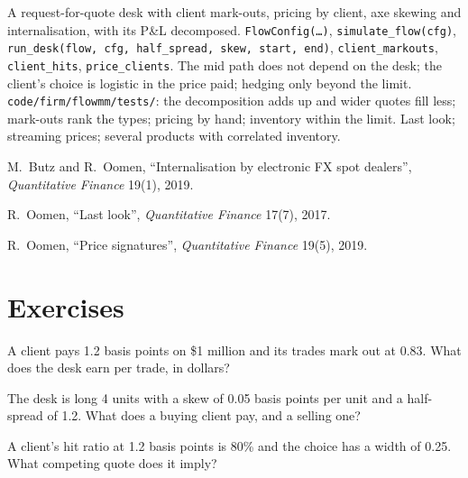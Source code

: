 \begin{build}
 A request-for-quote desk with client mark-outs, pricing by client, axe skewing and internalisation, with its P\&L decomposed.
 \texttt{FlowConfig(\dots)}, \texttt{simulate\_flow(cfg)}, \texttt{run\_desk(flow, cfg, half\_spread, skew, start, end)},
\texttt{client\_markouts}, \texttt{client\_hits}, \texttt{price\_clients}.
 The mid path does not depend on the desk; the client's choice is logistic in the price paid; hedging only beyond the limit.
 \texttt{code/firm/flowmm/tests/}: the decomposition adds up and wider quotes fill less; mark-outs rank the types; pricing
by hand; inventory within the limit.
 Last look; streaming prices; several products with correlated inventory.
\end{build}

\begin{omsources}
\item M.~Butz and R.~Oomen, ``Internalisation by electronic FX spot dealers'', \emph{Quantitative Finance} 19(1), 2019.
\item R.~Oomen, ``Last look'', \emph{Quantitative Finance} 17(7), 2017.
\item R.~Oomen, ``Price signatures'', \emph{Quantitative Finance} 19(5), 2019.
\end{omsources}

\section{Exercises}

\begin{exercise}[$\star$]\label{exo:s2:flow-market-making-at-a-bank:1}
A client pays 1.2 basis points on \$1 million and its trades mark out at 0.83. What does the desk earn per trade, in dollars?
\end{exercise}

\begin{exercise}[$\star$]\label{exo:s2:flow-market-making-at-a-bank:2}
The desk is long 4 units with a skew of 0.05 basis points per unit and a half-spread of 1.2. What does a buying client pay, and a selling one?
\end{exercise}

\begin{exercise}[$\star$]\label{exo:s2:flow-market-making-at-a-bank:3}
A client's hit ratio at 1.2 basis points is 80\% and the choice has a width of 0.25. What competing quote does it imply?
\end{exercise}

